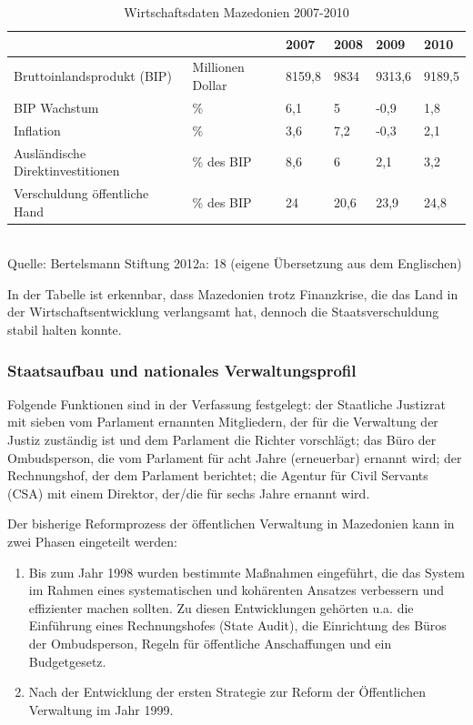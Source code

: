\begin{table}[H]
\caption{Wirtschaftsdaten Mazedonien 2007-2010}
\small{
\begin{tabular}{|R{46mm}|R{25mm}|R{15mm}|R{15mm}|R{15mm}|R{15mm}|}\hline
&&2007&2008&2009&2010\\\hline
Bruttoinlandsprodukt (BIP)&
Millionen Dollar&8159,8&9834&9313,6&9189,5\\\hline
BIP Wachstum&\%&6,1&5&-0,9&1,8\\\hline
Inflation &\%&3,6&7,2&-0,3&2,1\\\hline
Ausländische Direktinvestitionen &\% des BIP&8,6&6&2,1&3,2\\\hline
Verschuldung öffentliche Hand&\% des BIP&24&20,6&23,9&24,8\\\hline
\end{tabular}\\
Quelle: Bertelsmann Stiftung 2012a: 18 (eigene Übersetzung aus dem Englischen)
}\end{table}



In der Tabelle ist erkennbar, dass Mazedonien trotz Finanzkrise, die das Land in der Wirtschaftsentwicklung verlangsamt hat, dennoch die Staatsverschuldung stabil halten konnte.
\subsubsection{Staatsaufbau und nationales Verwaltungsprofil}
Folgende Funktionen sind in der Verfassung festgelegt: der Staatliche Justizrat mit sieben vom Parlament ernannten Mitgliedern, der für die Verwaltung der Justiz zuständig ist und dem Parlament die Richter vorschlägt; das Büro der Ombudsperson, die vom Parlament für acht Jahre (erneuerbar) ernannt wird; der Rechnungshof, der dem Parlament berichtet; die Agentur für Civil Servants (CSA) mit einem Direktor, der/die für sechs Jahre ernannt wird. \par

Der bisherige Reformprozess der öffentlichen Verwaltung in Mazedonien kann in zwei Phasen eingeteilt werden: 
\begin{enumerate}[label= {\alph*}), leftmargin=*]
\item Bis zum Jahr 1998 wurden bestimmte Maßnahmen eingeführt, die das System im Rahmen eines systematischen und kohärenten Ansatzes verbessern und effizienter machen sollten. Zu diesen Entwicklungen gehörten u.a. die Einführung eines Rechnungshofes (State Audit), die Einrichtung des Büros der Ombudsperson, Regeln für öffentliche Anschaffungen und ein Budgetgesetz.
\item Nach der Entwicklung der ersten Strategie zur Reform der Öffentlichen Verwaltung im Jahr 1999. 
\end{enumerate}

